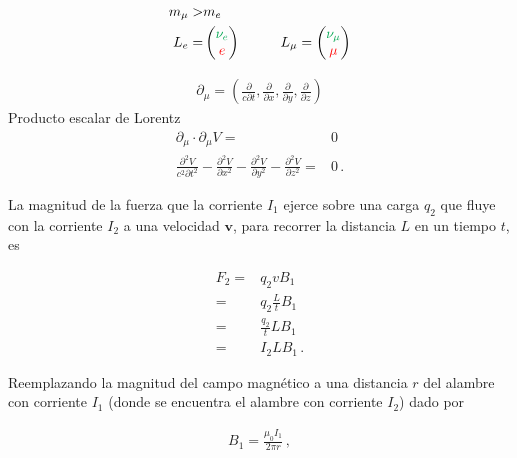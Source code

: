 \documentclass[11pt,a4paper]{article}
\begin{document}
\begin{align*}
m_\mu >& m_e\\
    L_e =&\begin{pmatrix}
      \color{Green}  \nu_e\\
       \color{red} e
    \end{pmatrix} \hspace{1cm}
    L_\mu= \begin{pmatrix}
      \color{Green}  \nu_\mu\\
       \color{red} \mu
    \end{pmatrix}
\end{align*}

\begin{align*}
    \partial_\mu = \left(\frac{\partial}{c\partial t},
    \frac{\partial}{\partial x},
    \frac{\partial}{\partial y},
    \frac{\partial}{\partial z}\right)
\end{align*}
\hspace{5cm}Producto escalar de Lorentz
\begin{align*}
    \partial_\mu\cdot \partial_\mu V =& 0\\ 
    \frac{\partial^2 V}{c^2\partial t^2}-
    \frac{\partial^2 V}{\partial x^2}-
    \frac{\partial^2 V}{\partial y^2}-
    \frac{\partial^2 V}{\partial z^2} =& 0\,.
\end{align*}

\newpage
\def\mipa{11cm}
\begin{minipage}{\mipa}
La magnitud de la fuerza que la corriente $I_1$ ejerce sobre una carga $q_2$ que fluye con la corriente $I_2$ a una velocidad $\boldsymbol{v}$, para recorrer la distancia $L$ en un tiempo $t$, es
\end{minipage}

\begin{align*}
F_2 =& q_2 v B_1\\
=& q_2\frac{L}{t} B_1\\
=& \frac{q_2}{t} L B_1\\
=& I_2 L B_1\,.
\end{align*}

\begin{minipage}{\mipa}
Reemplazando la magnitud del campo magnético 
a una distancia $r$ del alambre con corriente $I_1$ (donde se encuentra el alambre con corriente $I_2$) dado por
\end{minipage}

\begin{align*}
    B_1 = \frac{\mu_0 I_1}{2\pi r}\,,
\end{align*}
\end{document}
